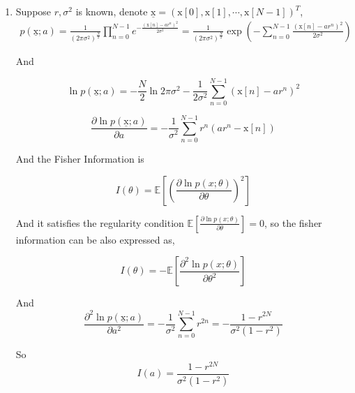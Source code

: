 \documentclass[a4paper]{article}
\begin{document}
\begin{enumerate}
\item Suppose $r,\sigma^2$ is known, denote $\underline{\mathrm{x}} = (\mathrm{x}[0],\mathrm{x}[1],\cdots,\mathrm{x}[N-1])^T$, 
\begin{equation}
  \begin{aligned}
    p(\underline{\mathrm{x}};a) = \frac{1}{(2\pi \sigma^2)^{\frac{N}{2}}} \prod_{n=0}^{N-1} e^{-\frac{(\mathrm{x}[n]-ar^n)^2}{2\sigma^2}} = \frac{1}{(2\pi \sigma^2)^{\frac{N}{2}}}  \exp\left( - \sum_{n=0}^{N-1} \frac{(\mathrm{x}[n]-ar^n)^2}{2\sigma^2} \right)
  \end{aligned}
\end{equation}

And 

\begin{equation}
  \ln p(\underline{\mathrm{x}};a) = -\frac{N}{2} \ln 2\pi \sigma^2 - \frac{1}{2\sigma^2} \sum_{n=0}^{N-1} {(\mathrm{x}[n]-ar^n)^2}
\end{equation}

\begin{equation}
  \frac{\partial \ln p(\underline{\mathrm{x}};a)}{ \partial a} = -\frac{1}{\sigma^2} \sum_{n=0}^{N-1} r^n(ar^n - \mathrm{x}[n])
\end{equation}

And the Fisher Information is 

\begin{equation}
  I(\theta) = \mathbb{E} \left[\left(\frac{\partial\ln p(x;\theta)}{\partial \theta}\right)^2 \right]
\end{equation}

And it satisfies the regularity condition $\mathbb{E} \left[\frac{\partial\ln p(x;\theta)}{\partial \theta} \right] = 0$, so the fisher information can be also expressed as,

\begin{equation}
  I(\theta) = -\mathbb{E} \left[\frac{\partial ^2\ln p(x;\theta)}{\partial \theta^2} \right]
\end{equation}

And \begin{equation}
  \frac{\partial^2 \ln p(\underline{\mathrm{x}};a)}{ \partial a^2} = -\frac{1}{\sigma^2} \sum_{n=0}^{N-1} r^{2n} = - \frac{1-r^{2N}}{ \sigma^2 (1-r^2)}
\end{equation}


So \begin{equation}
  I(a) = \frac{1-r^{2N}}{\sigma^2 (1-r^2)}
\end{equation}


\end{enumerate}
\end{document}
